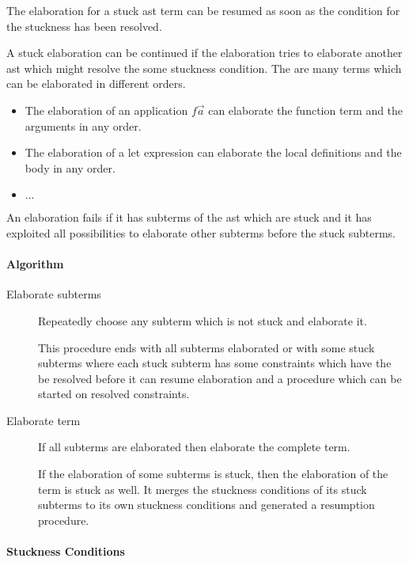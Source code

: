 The elaboration for a stuck ast term can be resumed as soon as the condition for
the stuckness has been resolved.

A stuck elaboration can be continued if the elaboration tries to elaborate
another ast which might resolve the some stuckness condition. The are many terms
which can be elaborated in different orders.

\begin{itemize}
    \item The elaboration of an application $f \vec a$ can elaborate the
        function term and the arguments in any order.

    \item The elaboration of a let expression can elaborate the local
        definitions and the body in any order.

    \item $\ldots$
\end{itemize}

An elaboration fails if it has subterms of the ast which are stuck and it has
exploited all possibilities to elaborate other subterms before the stuck
subterms.


\paragraph{Algorithm}

\begin{description}
\item [Elaborate subterms]

    Repeatedly choose any subterm which is not stuck and elaborate it.

    This procedure ends with all subterms elaborated or with some stuck subterms
    where each stuck subterm has some constraints which have the be resolved
    before it can resume elaboration and a procedure which can be started on
    resolved constraints.

\item [Elaborate term]
    If all subterms are elaborated then elaborate the complete term.

    If the elaboration of some subterms is stuck, then the elaboration of the
    term is stuck as well. It merges the stuckness conditions of its stuck
    subterms to its own stuckness conditions and generated a resumption
    procedure.
\end{description}



\paragraph{Stuckness Conditions}

